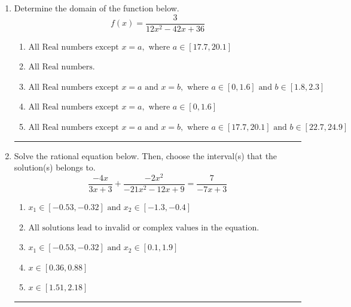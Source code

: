 \documentclass[14pt]{extbook}
\newcommand{\litem}[1]{\item#1\hspace*{-1cm}\rule{\textwidth}{0.4pt}}
\begin{document}
\begin{enumerate}
{\begin{enumerate}[label=\Alph*.]
\end{enumerate} }
\litem{
Determine the domain of the function below.\[ f(x) = \frac{3}{12x^{2} -42 x + 36} \]\begin{enumerate}[label=\Alph*.]
\item \( \text{All Real numbers except } x = a, \text{ where } a \in [17.7, 20.1] \)
\item \( \text{All Real numbers.} \)
\item \( \text{All Real numbers except } x = a \text{ and } x = b, \text{ where } a \in [0, 1.6] \text{ and } b \in [1.8, 2.3] \)
\item \( \text{All Real numbers except } x = a, \text{ where } a \in [0, 1.6] \)
\item \( \text{All Real numbers except } x = a \text{ and } x = b, \text{ where } a \in [17.7, 20.1] \text{ and } b \in [22.7, 24.9] \)

\end{enumerate} }
\litem{
Solve the rational equation below. Then, choose the interval(s) that the solution(s) belongs to.\[ \frac{-4x}{3x + 3} + \frac{-2x^{2}}{-21x^{2} -12 x + 9} = \frac{7}{-7x + 3} \]\begin{enumerate}[label=\Alph*.]
\item \( x_1 \in [-0.53, -0.32] \text{ and } x_2 \in [-1.3,-0.4] \)
\item \( \text{All solutions lead to invalid or complex values in the equation.} \)
\item \( x_1 \in [-0.53, -0.32] \text{ and } x_2 \in [0.1,1.9] \)
\item \( x \in [0.36,0.88] \)
\item \( x \in [1.51,2.18] \)

\end{enumerate} }
\end{enumerate}
\end{document}
